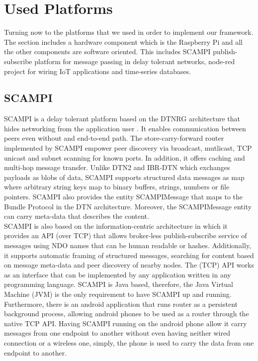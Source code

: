 \section{Used Platforms}
Turning now to  the platforms that we used in order to implement our framework. The section includes a hardware component which is the Raspberry Pi and all the other components are software oriented. This includes SCAMPI publish-subscribe platform for message passing in delay tolerant networks, node-red project for wiring IoT applications and time-series databases.

\subsection{SCAMPI}
SCAMPI is a delay tolerant platform based on the DTNRG architecture that hides networking from the application user \cite{Karkkainen:2012:SAP:2348616.2348636}. It enables communication between peers even without and end-to-end path. The store-carry-forward router implemented by SCAMPI empower peer discovery via broadcast, mutlicast, TCP unicast  and subnet scanning for known ports. In addition, it offers caching and multi-hop message transfer. Unlike DTN2 and IBR-DTN which exchanges payloads as blobs of data, SCAMPI supports structured data messages as map where arbitrary string keys map to binary buffers, strings, numbers or file pointers. SCAMPI also provides the entity SCAMPIMessage that maps to the Bundle Protocol in the DTN architecture. Moreover, the SCAMPIMessage entity can carry meta-data that describes the content. \\

\noindent SCAMPI is also based on the information-centric architecture in which it provides an API (over TCP) that allows broker-less publish-subscribe service of messages using NDO names that can be human readable or hashes. Additionally, it supports automatic framing of structured messages, searching for content based on message meta-data and peer discovery of nearby nodes. The (TCP) API works as an interface that can be implemented by any application written in any programming language. SCAMPI is Java based, therefore, the Java Virtual Machine (JVM) is the only requirement to have SCAMPI up and running. Furthermore, there is an android application that runs router as a persistent background process, allowing android phones to be used as a router through the native TCP API. Having SCAMPI running on the android phone allow it carry messages from one endpoint to another without even having neither wired connection or a wireless one, simply, the phone is used to carry the data from one endpoint to another. \\

